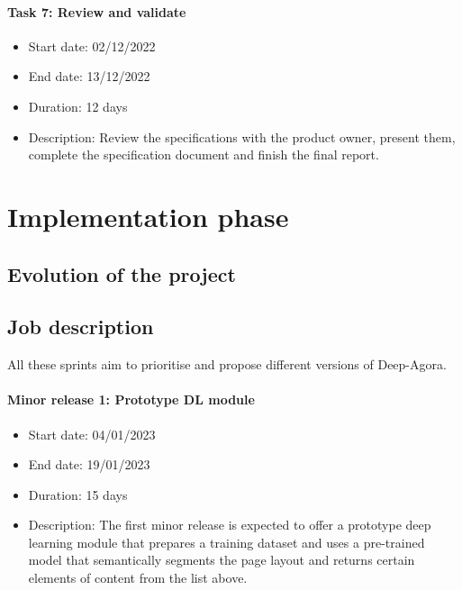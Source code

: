 \documentclass{polytech/polytech}
\numberwithin{figure}{chapter}
\begin{document}
\begin{appendix}
\paragraph{Task 7: Review and validate}
\begin{itemize}
    \item Start date: 02/12/2022
    \item End date: 13/12/2022
    \item Duration: 12 days
    \item
        Description: Review the specifications with the product owner, present them, complete the specification document and finish the final report.
\end{itemize}


\section{Implementation phase}

\subsection{Evolution of the project}

\label{plan}

\subsection{Job description}

All these sprints aim to prioritise and propose different versions of Deep-Agora.

\paragraph{Minor release 1: Prototype DL module}
\begin{itemize}
    \item Start date: 04/01/2023
    \item End date: 19/01/2023
    \item Duration: 15 days
    \item
        Description: The first minor release is expected to offer a prototype deep learning module that prepares a training dataset and uses a pre-trained model that semantically segments the page layout and returns certain elements of content from the list above.
\end{itemize}


\end{appendix}
\end{document}

